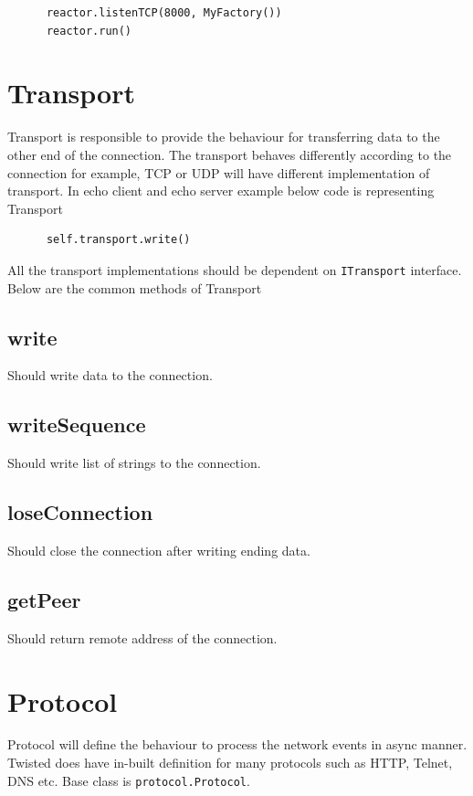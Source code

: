 \documentclass{article}
\begin{document}
    \begin{verbatim}
      reactor.listenTCP(8000, MyFactory())
      reactor.run()
    \end{verbatim}

  \section{Transport}

    Transport is responsible to provide the behaviour for transferring data to
    the other end of the connection. The transport behaves differently
    according to the connection for example, TCP or UDP will have different
    implementation of transport. 
    In echo client and echo server example below code is representing Transport

    \begin{verbatim}
      self.transport.write()
    \end{verbatim}

    All the transport implementations should be dependent on
    \texttt{ITransport} interface. Below are the common methods of Transport

    \subsection{write} Should write data to the connection.

    \subsection {writeSequence} Should write list of strings to the connection.

    \subsection{loseConnection} Should close the connection after writing
    ending data.

    \subsection{getPeer} Should return remote address of the connection.

  \section{Protocol}
    Protocol will define the behaviour to process the network events in async
    manner. Twisted does have in-built definition for many protocols such as
    HTTP, Telnet, DNS etc. Base class is \texttt{protocol.Protocol}.
\end{document}
